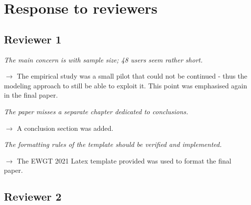 \documentclass[10pt]{article}
\begin{document}
\section*{Response to reviewers}

\subsection*{Reviewer 1}


\noindent\textit{The main concern is with sample size; 48 users seem rather short.}

\noindent$\rightarrow$ The empirical study was a small pilot that could not be continued - thus the modeling approach to still be able to exploit it. This point was emphasised again in the final paper.

\medskip

\noindent\textit{The paper misses a separate chapter dedicated to conclusions.}

\noindent$\rightarrow$ A conclusion section was added.

\medskip

\noindent\textit{The formatting rules of the template should be verified and implemented.}

\noindent$\rightarrow$ The EWGT 2021 Latex template provided was used to format the final paper.


\bigskip

\subsection*{Reviewer 2}


\end{document}
